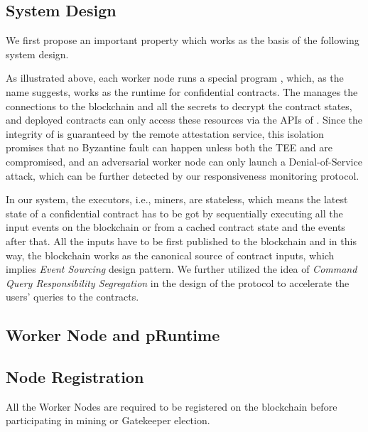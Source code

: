 \subsection{System Design}

We first propose an important property which works as the basis of the following system design.

As illustrated above, each worker node runs a special program \pruntime, which, as the name suggests, works as the runtime for confidential contracts.
The \pruntime manages the connections to the blockchain and all the secrets to decrypt the contract states, and deployed contracts can only access these resources via the APIs of \pruntime.
Since the integrity of \pruntime is guaranteed by the remote attestation service, this isolation promises that no Byzantine fault can happen unless both the TEE and \pruntime are compromised, and an adversarial worker node can only launch a Denial-of-Service attack, which can be further detected by our responsiveness monitoring protocol.

In our system, the executors, i.e., miners, are stateless, which means the latest state of a confidential contract has to be got by sequentially executing all the input events on the blockchain or from a cached contract state and the events after that. All the inputs have to be first published to the blockchain and in this way, the blockchain works as the canonical source of contract inputs, which implies \textit{Event Sourcing} design pattern. We further utilized the idea of \textit{Command Query Responsibility Segregation} in the design of the protocol to accelerate the users' queries to the contracts.

\subsection{Worker Node and pRuntime}


\subsection{Node Registration}

All the Worker Nodes are required to be registered on the blockchain before participating in mining or Gatekeeper election.

